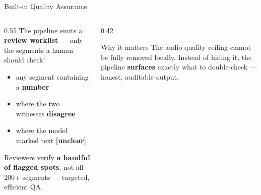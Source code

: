 \documentclass[aspectratio=169,10pt]{beamer}
\begin{document}
\begin{frame}{Built-in Quality Assurance}
  \begin{columns}[T]
    \begin{column}{0.55\textwidth}
      The pipeline emits a \textbf{review worklist} --- only the segments a
      human should check:
      \begin{itemize}\small
        \item any segment containing a \textbf{number}
        \item where the two witnesses \textbf{disagree}
        \item where the model marked text \textbf{[unclear]}
      \end{itemize}
      \vspace{0.4em}
      Reviewers verify \textbf{a handful of flagged spots}, not all 200+
      segments --- targeted, efficient QA.
    \end{column}
    \begin{column}{0.42\textwidth}
      \begin{block}{Why it matters}
        \small The audio quality ceiling cannot be fully removed locally.
        Instead of hiding it, the pipeline \textbf{surfaces} exactly what to
        double-check --- honest, auditable output.
      \end{block}
    \end{column}
  \end{columns}
\end{frame}
\end{document}

